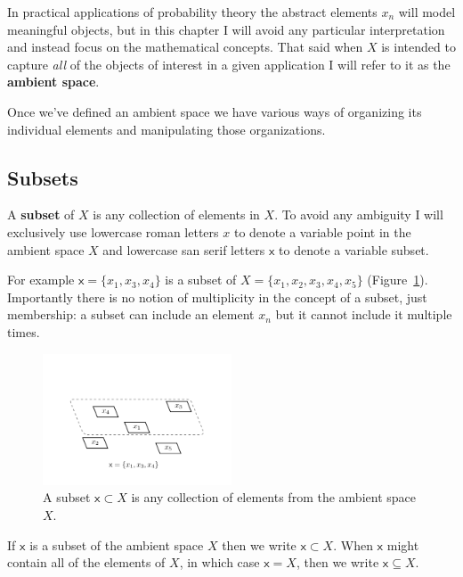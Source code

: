 \documentclass[
  letterpaper,
  DIV=11,
  numbers=noendperiod]{scrartcl}
\begin{document}
In practical applications of probability theory the abstract elements
\(x_{n}\) will model meaningful objects, but in this chapter I will
avoid any particular interpretation and instead focus on the
mathematical concepts. That said when \(X\) is intended to capture
\emph{all} of the objects of interest in a given application I will
refer to it as the \textbf{ambient space}.

Once we've defined an ambient space we have various ways of organizing
its individual elements and manipulating those organizations.

\hypertarget{subsets}{%
\subsection{Subsets}\label{subsets}}

A \textbf{subset} of \(X\) is any collection of elements in \(X\). To
avoid any ambiguity I will exclusively use lowercase roman letters \(x\)
to denote a variable point in the ambient space \(X\) and lowercase san
serif letters \(\mathsf{x}\) to denote a variable subset.

For example \(\mathsf{x} = \{x_1, x_3, x_4\}\) is a subset of
\(X = \{x_1, x_2, x_3, x_4, x_5\}\) (Figure~\ref{fig-subset}).
Importantly there is no notion of multiplicity in the concept of a
subset, just membership: a subset can include an element \(x_{n}\) but
it cannot include it multiple times.

\begin{figure}

{\centering \includegraphics[width=0.5\textwidth,height=\textheight]{figures/subset/subset.pdf}

}

\caption{\label{fig-subset}A subset \(\mathsf{x} \subset X\) is any
collection of elements from the ambient space \(X\).}

\end{figure}

If \(\mathsf{x}\) is a subset of the ambient space \(X\) then we write
\(\mathsf{x} \subset X\). When \(\mathsf{x}\) might contain all of the
elements of \(X\), in which case \(\mathsf{x} = X\), then we write
\(\mathsf{x} \subseteq X\).
\end{document}
